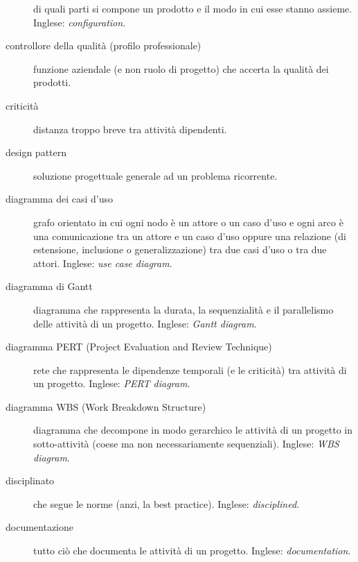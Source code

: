 \documentclass[a4paper]{article}
\begin{document}
\begin{description}
			di quali parti si compone un prodotto e il modo in cui esse stanno assieme. Inglese: \emph{configuration}.
			
	\item[controllore della qualità (profilo professionale)] 

			funzione aziendale (e non ruolo di progetto) che accerta la qualità dei prodotti.
			
	\item[criticità] 

			distanza troppo breve tra attività dipendenti.
			
	\item[design pattern] 

			soluzione progettuale generale ad un problema ricorrente.
			
	\item[diagramma dei casi d'uso] 

			grafo orientato in cui ogni nodo è un attore o un caso d'uso e ogni arco è una comunicazione tra un attore e un caso d'uso oppure una relazione (di estensione, inclusione o generalizzazione) tra due casi d'uso o tra due attori. Inglese: \emph{use case diagram}.
			
	\item[diagramma di Gantt] 

			diagramma che rappresenta la durata, la sequenzialità e il parallelismo delle attività di un progetto. Inglese: \emph{Gantt diagram}.
			
	\item[diagramma PERT (Project Evaluation and Review Technique)] 

			rete che rappresenta le dipendenze temporali (e le criticità) tra attività di un progetto. Inglese: \emph{PERT diagram}.
			
	\item[diagramma WBS (Work Breakdown Structure)] 

			diagramma che decompone in modo gerarchico le attività di un progetto in sotto-attività (coese ma non necessariamente sequenziali). Inglese: \emph{WBS diagram}.
			
	\item[disciplinato] 

			che segue le norme (anzi, la best practice). Inglese: \emph{disciplined}.
			
	\item[documentazione] 

			tutto ciò che documenta le attività di un progetto. Inglese: \emph{documentation}.
			

\end{description}
\end{document}
